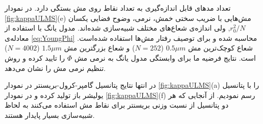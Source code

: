 تعداد مد‌های قابل اندازه‌گیری به تعداد نقاط روی مش بستگی دارد. در نمودار
\ref{fig:kappaULMS}(e)
مش‌هایی با ضریب سختی خمش، نرمی، وضوح فضایی یکسان
$r_0^2/N$,
 ولی اندازه‌ی شعاع‌های مختلف شبیه‌سازی شده‌اند. مدول یانگ‌ با استفاده از معادله‌ی
\ref{eq:YoungPhi}
محاسبه شده و برای توصیف رفتار مش‌ها استفاده شده‌است. شعاع کوچک‌ترین مش
$0.5\mu m$ ($N=252$)
و شعاع بزرگترین مش
$1.5\mu m$ ($N=4002$)
است. نتایج فرضیه ما برای وابستگی مدول یانگ به نرمی مش
$\Phi$
را تایید کرده و روش تنظیم نرمی مش را نشان می‌دهد.

در انتها نتایج پتانسیل گامپر-کرول-بریسنتر در نمودار 
\ref{fig:kappaULMS}(a)
 را با پتانسیل یولیشر 
\cite{Julicher1996}
باز تولید کرده و در نمودار 
\ref{fig:kappaULMS}(f)
رسم نمودیم. از آنجایی که هر دو پتانسیل از نسبت وزنی بریسنتر برای نقاط مش استفاده می‌کنند به لحاظ شبیه‌سازی بسیار پایدار هستند. 























